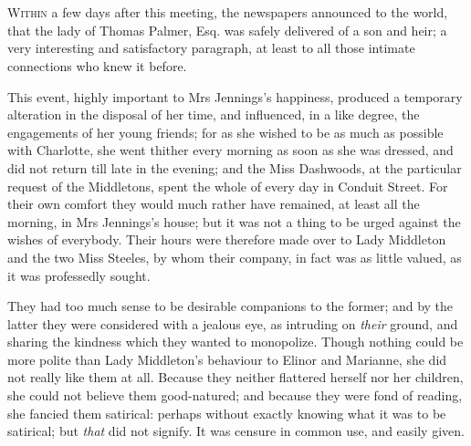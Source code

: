 \chapter[Chapter \thechapter]{}
\lettrine[lines=4,lraise=0.3]{W}{ithin} a few days after this meeting, the newspapers announced to the world, that the lady of Thomas Palmer, Esq. was safely delivered of a son and heir; a very interesting and satisfactory paragraph, at least to all those intimate connections who knew it before.

This event, highly important to Mrs Jennings’s happiness, produced a temporary alteration in the disposal of her time, and influenced, in a like degree, the engagements of her young friends; for as she wished to be as much as possible with Charlotte, she went thither every morning as soon as she was dressed, and did not return till late in the evening; and the Miss Dashwoods, at the particular request of the Middletons, spent the whole of every day in Conduit Street. For their own comfort they would much rather have remained, at least all the morning, in Mrs Jennings’s house; but it was not a thing to be urged against the wishes of everybody. Their hours were therefore made over to Lady Middleton and the two Miss Steeles, by whom their company, in fact was as little valued, as it was professedly sought.

They had too much sense to be desirable companions to the former; and by the latter they were considered with a jealous eye, as intruding on \textit{their} ground, and sharing the kindness which they wanted to monopolize. Though nothing could be more polite than Lady Middleton’s behaviour to Elinor and Marianne, she did not really like them at all. Because they neither flattered herself nor her children, she could not believe them good-natured; and because they were fond of reading, she fancied them satirical: perhaps without exactly knowing what it was to be satirical; but \textit{that} did not signify. It was censure in common use, and easily given.

